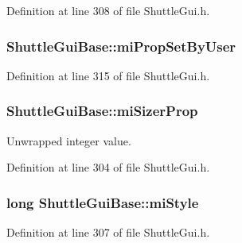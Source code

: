 Definition at line 308 of file Shuttle\+Gui.\+h.

\subsubsection[{\texorpdfstring{mi\+Prop\+Set\+By\+User}{miPropSetByUser}}]{ Shuttle\+Gui\+Base\+::mi\+Prop\+Set\+By\+User\hspace{0.3cm}{\ttfamily [protected]}}\hypertarget{class_shuttle_gui_base_ac129e63a7ecb5f50b59ef3afa7cd795e}{}\label{class_shuttle_gui_base_ac129e63a7ecb5f50b59ef3afa7cd795e}


Definition at line 315 of file Shuttle\+Gui.\+h.

\subsubsection[{\texorpdfstring{mi\+Sizer\+Prop}{miSizerProp}}]{ Shuttle\+Gui\+Base\+::mi\+Sizer\+Prop\hspace{0.3cm}{\ttfamily [protected]}}\hypertarget{class_shuttle_gui_base_a77a21d3baf6e719f2359f5292eb5c853}{}\label{class_shuttle_gui_base_a77a21d3baf6e719f2359f5292eb5c853}


Unwrapped integer value. 



Definition at line 304 of file Shuttle\+Gui.\+h.

\subsubsection[{\texorpdfstring{mi\+Style}{miStyle}}]{\setlength{\rightskip}{0pt plus 5cm}long Shuttle\+Gui\+Base\+::mi\+Style\hspace{0.3cm}{\ttfamily [protected]}}\hypertarget{class_shuttle_gui_base_a4d3cb6967df988aa21fd00904ea8d43a}{}\label{class_shuttle_gui_base_a4d3cb6967df988aa21fd00904ea8d43a}


Definition at line 307 of file Shuttle\+Gui.\+h.

